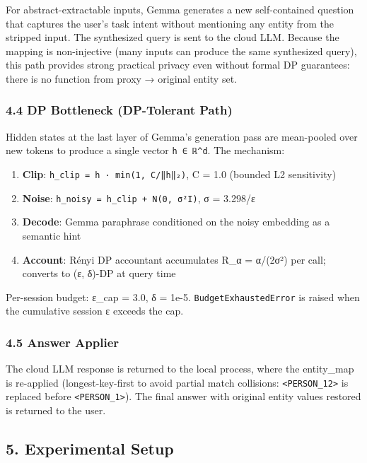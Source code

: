 For abstract-extractable inputs, Gemma generates a new self-contained
question that captures the user's task intent without mentioning any
entity from the stripped input. The synthesized query is sent to the
cloud LLM. Because the mapping is non-injective (many inputs can produce
the same synthesized query), this path provides strong practical privacy
even without formal DP guarantees: there is no function from proxy →
original entity set.

\subsubsection{4.4 DP Bottleneck (DP-Tolerant
Path)}\label{dp-bottleneck-dp-tolerant-path}

Hidden states at the last layer of Gemma's generation pass are
mean-pooled over new tokens to produce a single vector
\texttt{h\ ∈\ ℝ\^{}d}. The mechanism:

\begin{enumerate}
\def\labelenumi{\arabic{enumi}.}
\tightlist
\item
  \textbf{Clip}: \texttt{h\_clip\ =\ h\ ·\ min(1,\ C/‖h‖₂)}, C = 1.0
  (bounded L2 sensitivity)
\item
  \textbf{Noise}: \texttt{h\_noisy\ =\ h\_clip\ +\ N(0,\ σ²I)}, σ =
  3.298/ε
\item
  \textbf{Decode}: Gemma paraphrase conditioned on the noisy embedding
  as a semantic hint
\item
  \textbf{Account}: Rényi DP accountant accumulates R\_α = α/(2σ²) per
  call; converts to (ε, δ)-DP at query time
\end{enumerate}

Per-session budget: ε\_cap = 3.0, δ = 1e-5.
\texttt{BudgetExhaustedError} is raised when the cumulative session ε
exceeds the cap.

\subsubsection{4.5 Answer Applier}\label{answer-applier}

The cloud LLM response is returned to the local process, where the
entity\_map is re-applied (longest-key-first to avoid partial match
collisions: \texttt{\textless{}PERSON\_12\textgreater{}} is replaced
before \texttt{\textless{}PERSON\_1\textgreater{}}). The final answer
with original entity values restored is returned to the user.

\subsection{5. Experimental Setup}\label{experimental-setup}

